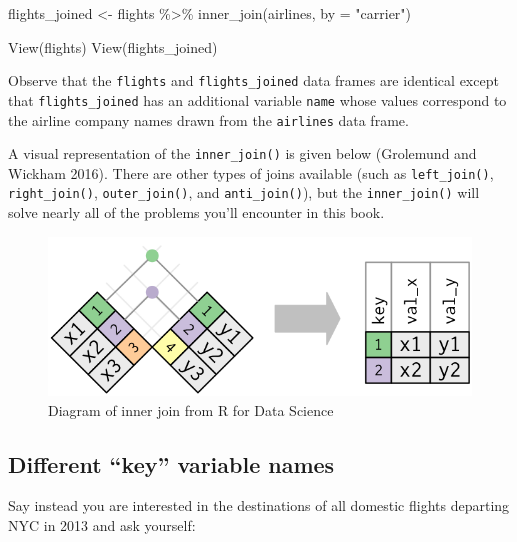 \documentclass[
  letterpaper,
  DIV=11,
  numbers=noendperiod]{scrreprt}
\newenvironment{Shaded}{\begin{snugshade}}{\end{snugshade}}
\newcommand{\AttributeTok}[1]{\textcolor[rgb]{0.40,0.45,0.13}{#1}}
\newcommand{\FunctionTok}[1]{\textcolor[rgb]{0.28,0.35,0.67}{#1}}
\newcommand{\NormalTok}[1]{\textcolor[rgb]{0.00,0.23,0.31}{#1}}
\newcommand{\OtherTok}[1]{\textcolor[rgb]{0.00,0.23,0.31}{#1}}
\newcommand{\SpecialCharTok}[1]{\textcolor[rgb]{0.37,0.37,0.37}{#1}}
\newcommand{\StringTok}[1]{\textcolor[rgb]{0.13,0.47,0.30}{#1}}
\theoremstyle{definition}
\theoremstyle{remark}
\begin{document}
\begin{Shaded}
\begin{Highlighting}[]
\NormalTok{flights\_joined }\OtherTok{\textless{}{-}}\NormalTok{ flights }\SpecialCharTok{\%\textgreater{}\%} 
  \FunctionTok{inner\_join}\NormalTok{(airlines, }\AttributeTok{by =} \StringTok{"carrier"}\NormalTok{)}

\FunctionTok{View}\NormalTok{(flights)}
\FunctionTok{View}\NormalTok{(flights\_joined)}
\end{Highlighting}
\end{Shaded}

Observe that the \texttt{flights} and \texttt{flights\_joined} data
frames are identical except that \texttt{flights\_joined} has an
additional variable \texttt{name} whose values correspond to the airline
company names drawn from the \texttt{airlines} data frame.

A visual representation of the \texttt{inner\_join()} is given below
(Grolemund and Wickham 2016). There are other types of joins available
(such as \texttt{left\_join()}, \texttt{right\_join()},
\texttt{outer\_join()}, and \texttt{anti\_join()}), but the
\texttt{inner\_join()} will solve nearly all of the problems you'll
encounter in this book.

\begin{figure}

{\centering \includegraphics{images/join-inner.png}

}

\caption{\label{fig-ij-diagram}Diagram of inner join from R for Data
Science}

\end{figure}

\hypertarget{sec-diff-key}{%
\subsection{Different ``key'' variable names}\label{sec-diff-key}}

Say instead you are interested in the destinations of all domestic
flights departing NYC in 2013 and ask yourself:
\end{document}
